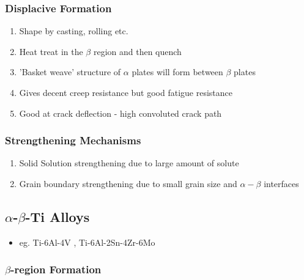 
\subsubsection{Displacive Formation} %
\label{ssub:displacive_formation}

\begin{enumerate}
  \item Shape by casting, rolling etc.
  \item Heat treat in the $\beta$ region and then quench
  \item 'Basket weave' structure of $\alpha$ plates will form between $\beta$ plates
  \item Gives decent creep resistance but good fatigue resistance
  \item Good at crack deflection - high convoluted crack path
\end{enumerate}


\subsubsection{Strengthening Mechanisms} %
\label{ssub:strengthening_mechanisms}

\begin{enumerate}
  \item Solid Solution strengthening due to large amount of solute
  \item Grain boundary strengthening due to small grain size and $\alpha-\beta$ interfaces
\end{enumerate}


\subsection{$\alpha$-$\beta$-Ti Alloys} %
\label{sub:}
\begin{itemize}
  \item eg. Ti-6Al-4V , Ti-6Al-2Sn-4Zr-6Mo
\end{itemize}

\subsubsection{$\beta$-region Formation} %
\label{ssub:}

